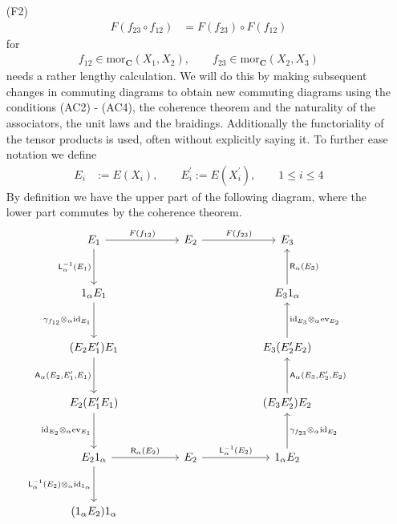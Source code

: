 \begin{prf}
\begin{enumerate}
\item[(F2)]
\begin{align*}
  F(f_{23} \circ f_{12})
  &=
  F(f_{23}) \circ F(f_{12})
\end{align*}
for
\begin{align*}
  f_{12} \in \mathrm{mor}_{\mathbf{C}}(X_{1},X_{2})
  ,\qquad
  f_{23} \in \mathrm{mor}_{\mathbf{C}}(X_{2},X_{3})
\end{align*}
needs a rather lengthy calculation. We will do this by making subsequent changes in commuting diagrams to obtain new commuting diagrams using the conditions (AC2) - (AC4), the coherence theorem and the naturality of the associators, the unit laws and the braidings. Additionally the functoriality of the tensor products is used, often without explicitly saying it. To further ease notation we define
\begin{align*}
  E_{i}
  &:=
  E(X_{i})
  ,\qquad
  E_{i}^{\prime}
  :=
  E(X_{i}^{\prime})
  ,\qquad
  1
  \leq
  i
  \leq
  4
\end{align*}
By definition we have the upper part of the following diagram, where the lower part commutes by the coherence theorem.
\begin{equation*}
\hspace{-2em}
\begin{tikzcd}[row sep=3.2em,column sep=5em]
  E_{1}
  \ar{r}{F(f_{12})}
  \ar{d}[swap]{\mathsf{L}_{\alpha}^{-1}(E_{1})}
  &
  E_{2}
  \ar{r}{F(f_{23})}
  &
  E_{3}
  \\
  1_{\alpha} E_{1}
  \ar{d}[swap]{\gamma_{f_{12}} \otimes_{\alpha} \mathrm{id}_{E_{1}}}
  &
  &
  E_{3} 1_{\alpha}
  \ar{u}[swap]{\mathsf{R}_{\alpha}(E_{3})}
  \\
  (E_{2} E_{1}^{\prime}) E_{1}
  \ar{d}[swap]{\mathsf{A}_{\alpha}(E_{2},E_{1}^{\prime},E_{1})}
  &
  &
  E_{3} (E_{2}^{\prime} E_{2})
  \ar{u}[swap]{\mathrm{id}_{E_{3}} \otimes_{\alpha} \mathrm{ev}_{E_{2}}}
  \\
  E_{2} (E_{1}^{\prime} E_{1})
  \ar{d}[swap]{\mathrm{id}_{E_{2}} \otimes_{\alpha} \mathrm{ev}_{E_{1}}}
  &
  &
  (E_{3} E_{2}^{\prime}) E_{2}
  \ar{u}[swap]{\mathsf{A}_{\alpha}(E_{3},E_{2}^{\prime},E_{2})}
  \\
  E_{2} 1_{\alpha}
  \ar{r}{\mathsf{R}_{\alpha}(E_{2})}
  \ar{d}[swap]{\mathsf{L}_{\alpha}^{-1}(E_{2}) \otimes_{\alpha} \mathrm{id}_{1_{\alpha}}}
  &
  E_{2}
  \ar{r}{\mathsf{L}_{\alpha}^{-1}(E_{2})}
  &
  1_{\alpha} E_{2}
  \ar{u}[swap]{\gamma_{f_{23}} \otimes_{\alpha} \mathrm{id}_{E_{2}}}
  \\
  (1_{\alpha} E_{2}) 1_{\alpha}

\end{tikzcd}
\end{equation*}
\end{enumerate}
\end{prf}
